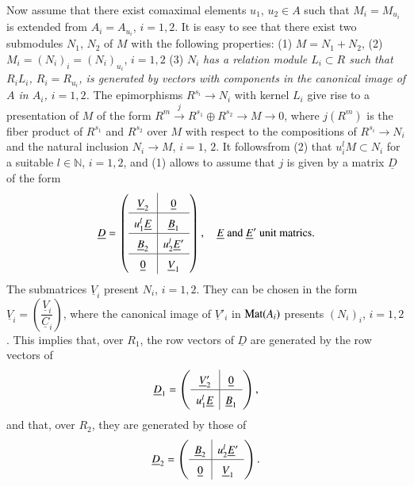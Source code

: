 Now assume that there exist comaximal elements $u_{1}$, $u_{2}\in A$
such that $M_{i}=M_{u_{i}}$ is extended from $A_{i}=A_{u_{i}}$,
$i=1,2$. It is easy to see that there exist two submodules $N_{1}$,
$N_{2}$ of $M$ with the following properties: (1) $M=N_{1}+N_{2}$, (2)
$M_{i}=(N_{i})_{i}=(N_{i})_{u_{i}}$, $i=1,2$ (3) $N_{i}$ {\em has a
relation module $L_{i}\subset R$ such that $R_{i}L_{i}$,
$R_{i}=R_{u_{i}}$, is generated by vectors with components in the
canonical image of $A$ in $A_{i}$, $i=1,2$.} The epimorphisms
$R^{s_{i}}\to N_{i}$ with kernel $L_{i}$ give rise to a presentation
of $M$ of the form $R^{m}\xrightarrow{j}R^{s_1}\oplus R^{s_{2}}\to
M\to 0$, where $j(R^{m})$ is the fiber product of $R^{s_{1}}$ and
$R^{s_{2}}$ over $M$ with respect to the compositions of $R^{s_{i}}\to
N_{i}$ and the natural inclusion $N_{i}\to M$, $i=1$, $2$. It
follows\pageoriginale from (2) that $u^{l}_{i}M\subset N_{i}$ for a
suitable $l\in \mathbb{N}$, $i=1,2$, and (1) allows to assume that $j$
is given by a matrix $\underline{D}$ of the form
$$
\underline{D}=
\left(
\renewcommand{\arraystretch}{1.5}
\begin{array}{c|c}
\underline{V}_{2} & \underline{0}\\
\hline
u^{l}_{1}\underline{E} & \underline{B}_{1}\\
\hline
\underline{B}_{2} & u^{l}_{2}\underline{E}'\\
\hline
\underline{0} & \underline{V}_{1}
\end{array}
\right),\quad \underline{E}\text{~~ and~~ } \underline{E}'\text{~~
unit matrics.}
$$
The submatrices $\underline{V}_{i}$ present $N_{i}$, $i=1,2$. They can
be chosen in the form
$\underline{V}_{i}=\left(\dfrac{\underline{V}_{i}}{\underline{C}_{i}}\right)$,
where the canonical image of $\underline{V}'_{i}$ in $\operatorname{Mat}(A_{i})$
presents $(N_{i})_{i}$, $i=1,2$. This implies that, over $R_{1}$, the
row vectors of $\underline{D}$ are generated by the row vectors of
$$
\underline{D}_{1}=\left(
\renewcommand{\arraystretch}{1.5}
\begin{array}{c|c} 
\underline{V}'_{2} & \underline{0}\\
\hline
u^{l}_{1}\underline{E} & \underline{B}_{1}
\end{array}
\right),
$$
and that, over $R_{2}$, they are generated by those of 
$$
\underline{D}_{2}=
\left(
\renewcommand{\arraystretch}{1.5}
\begin{array}{c|c}
\underline{B}_{2} & u^{l}_{2}\underline{E}'\\
\hline
\underline{0} & \underline{V}_{1}
\end{array}
\right).
$$
